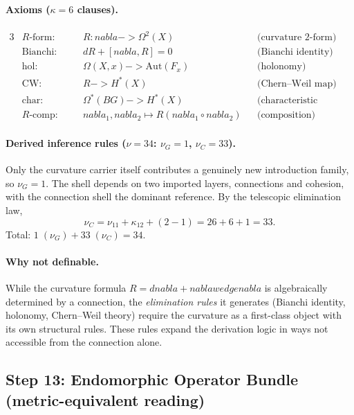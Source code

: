 \documentclass[11pt,a4paper]{article}
\def\to{->}%
\def\nabla{nabla}%
\def\wedge{wedge}%
\theoremstyle{plain}
\theoremstyle{definition}
\theoremstyle{remark}
\begin{document}
\paragraph{Axioms ($\kappa = 6$ clauses).}
\begin{alignat*}{3}
    &R\text{-form:}             &\quad& R : \nabla \to \Omega^2(X)
        && \text{(curvature 2-form)} \\
    &\mathrm{Bianchi}\text{:}   && dR + [\nabla, R] = 0
        && \text{(Bianchi identity)} \\
    &\mathrm{hol}\text{:}       && \Omega(X, x) \to \mathrm{Aut}(F_x)
        && \text{(holonomy)} \\
    &\mathrm{CW}\text{:}        && R \to H^*(X)
        && \text{(Chern--Weil map)} \\
    &\mathrm{char}\text{:}      && \Omega^*(BG) \to H^*(X)
        && \text{(characteristic classes)} \\
    &R\text{-comp:}             && \nabla_1, \nabla_2 \mapsto R(\nabla_1 \circ \nabla_2)
        && \text{(composition)}
\end{alignat*}

\paragraph{Derived inference rules ($\nu = 34$: $\nu_G = 1$, $\nu_C = 33$).}
Only the curvature carrier itself contributes a genuinely new introduction family, so $\nu_G = 1$.
The shell depends on two imported layers, connections and cohesion, with the connection shell the dominant reference. By the telescopic elimination law,
\[
  \nu_C = \nu_{11} + \kappa_{12} + (2-1) = 26 + 6 + 1 = 33.
\]
Total: $1\;(\nu_G) + 33\;(\nu_C) = 34$.

\paragraph{Why not definable.}
While the curvature formula $R = d\nabla + \nabla \wedge \nabla$ is algebraically determined by a connection, the \emph{elimination rules} it generates (Bianchi identity, holonomy, Chern--Weil theory) require the curvature as a first-class object with its own structural rules.
These rules expand the derivation logic in ways not accessible from the connection alone.

\subsection{\texorpdfstring{Step 13: Endomorphic Operator Bundle (metric-equivalent reading)}{Step 13: Endomorphic Operator Bundle (metric-equivalent reading)}}
\label{app:metric-spec}
\end{document}
